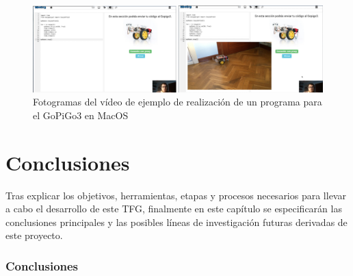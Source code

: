 \documentclass{report}
\begin{document}
\begin{figure}[h!]
  \centering
    \includegraphics[width=1\textwidth]{images/fotograma_ejercicio_GoPiGo.png}
  \caption{Fotogramas del vídeo de ejemplo de realización de un programa para el GoPiGo3 en MacOS}
  \label{Fotogramas del vídeo de ejemplo de realización de un programa para el GoPiGo3 en MacOS}
\end{figure}


\chapter{Conclusiones}

Tras explicar los objetivos, herramientas, etapas y procesos necesarios para llevar a cabo el desarrollo de este TFG, finalmente en este capítulo se especificarán las conclusiones principales y las posibles líneas de investigación futuras derivadas de este proyecto.

\subsection{Conclusiones}
\end{document}

